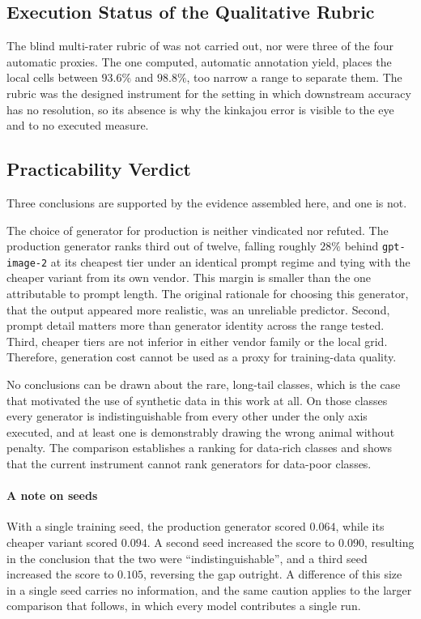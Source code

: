 \subsection{Execution Status of the Qualitative Rubric}\label{sec:results_rubric_not_executed}

The blind multi-rater rubric of  was not carried out, nor were three of the four automatic proxies. The one computed, automatic annotation yield, places the local cells between $93.6\%$ and $98.8\%$, too narrow a range to separate them. The rubric was the designed instrument for the setting in which downstream accuracy has no resolution, so its absence is why the kinkajou error is visible to the eye and to no executed measure.

\subsection{Practicability Verdict}\label{sec:results_practicability_verdict}

Three conclusions are supported by the evidence assembled here, and one is not.

The choice of generator for production is neither vindicated nor refuted. The production generator ranks third out of twelve, falling roughly $28\%$ behind \texttt{gpt-image-2} at its cheapest tier under an identical prompt regime and tying with the cheaper variant from its own vendor. This margin is smaller than the one attributable to prompt length. The original rationale for choosing this generator, that the output appeared more realistic, was an unreliable predictor. Second, prompt detail matters more than generator identity across the range tested. Third, cheaper tiers are not inferior in either vendor family or the local grid. Therefore, generation cost cannot be used as a proxy for training-data quality.

No conclusions can be drawn about the rare, long-tail classes, which is the case that motivated the use of synthetic data in this work at all. On those classes every generator is indistinguishable from every other under the only axis executed, and at least one is demonstrably drawing the wrong animal without penalty. The comparison establishes a ranking for data-rich classes and shows that the current instrument cannot rank generators for data-poor classes.

\paragraph{A note on seeds}
With a single training seed, the production generator scored $0.064$, while its cheaper variant scored $0.094$. A second seed increased the score to $0.090$, resulting in the conclusion that the two were \enquote{indistinguishable}, and a third seed increased the score to $0.105$, reversing the gap outright. A difference of this size in a single seed carries no information, and the same caution applies to the larger comparison that follows, in which every model contributes a single run.

